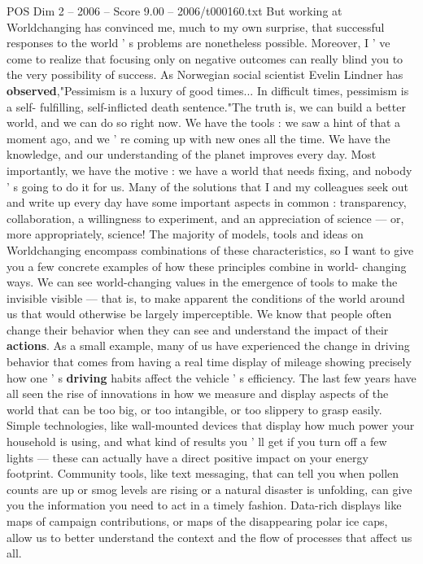 \begin{textsample}{POS Dim 2 – 2006 – Score 9.00 – 2006/t000160.txt}
But working at Worldchanging has convinced me, much to my own surprise, that successful responses to the world ' s problems are nonetheless possible.
Moreover, I ' ve come to realize that focusing only on negative outcomes can really blind you to the very possibility of success.
As Norwegian social scientist Evelin Lindner has \textbf{observed},"Pessimism is a luxury of good times...
In difficult times, pessimism is a self- fulfilling, self-inflicted death sentence."The truth is, we can build a better world, and we can do so right now.
We have the tools : we saw a hint of that a moment ago, and we ' re coming up with new ones all the time.
We have the knowledge, and our understanding of the planet improves every day.
Most importantly, we have the motive : we have a world that needs fixing, and nobody ' s going to do it for us.
Many of the solutions that I and my colleagues seek out and write up every day have some important aspects in common : transparency, collaboration, a willingness to experiment, and an appreciation of science — or, more appropriately, science!
The majority of models, tools and ideas on Worldchanging encompass combinations of these characteristics, so I want to give you a few concrete examples of how these principles combine in world- changing ways.
We can see world-changing values in the emergence of tools to make the invisible visible — that is, to make apparent the conditions of the world around us that would otherwise be largely imperceptible.
We know that people often change their behavior when they can see and understand the impact of their \textbf{actions}.
As a small example, many of us have experienced the change in driving behavior that comes from having a real time display of mileage showing precisely how one ' s \textbf{driving} habits affect the vehicle ' s efficiency.
The last few years have all seen the rise of innovations in how we measure and display aspects of the world that can be too big, or too intangible, or too slippery to grasp easily.
Simple technologies, like wall-mounted devices that display how much power your household is using, and what kind of results you ' ll get if you turn off a few lights — these can actually have a direct positive impact on your energy footprint.
Community tools, like text messaging, that can tell you when pollen counts are up or smog levels are rising or a natural disaster is unfolding, can give you the information you need to act in a timely fashion.
Data-rich displays like maps of campaign contributions, or maps of the disappearing polar ice caps, allow us to better understand the context and the flow of processes that affect us all.

\end{textsample}
